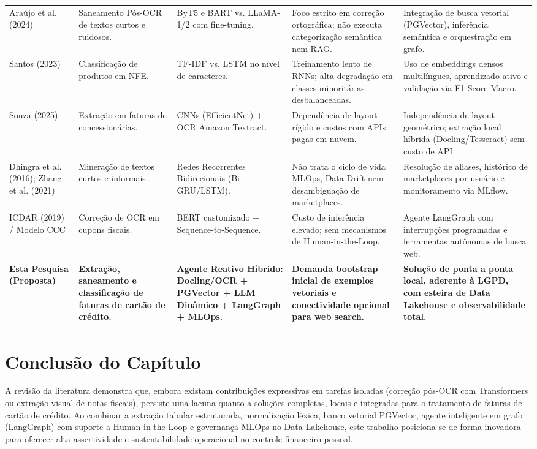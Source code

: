 \documentclass[
	12pt,				
	openright,			
	oneside,			
	a4paper,			
	english,			
	brazil				
	]{abntex2}
\begin{document}
\begin{tabularx}{\textwidth}{
		>{\raggedright\arraybackslash}p{2.6cm} 
		>{\raggedright\arraybackslash}X 
		>{\raggedright\arraybackslash}X 
		>{\raggedright\arraybackslash}X 
		>{\raggedright\arraybackslash}X
	}
	Araújo et al. (2024) & Saneamento Pós-OCR de textos curtos e ruidosos. & ByT5 e BART vs. LLaMA-1/2 com fine-tuning. & Foco estrito em correção ortográfica; não executa categorização semântica nem RAG. & Integração de busca vetorial (PGVector), inferência semântica e orquestração em grafo. \\
	\addlinespace
	Santos (2023) & Classificação de produtos em NFE. & TF-IDF vs. LSTM no nível de caracteres. & Treinamento lento de RNNs; alta degradação em classes minoritárias desbalanceadas. & Uso de embeddings densos multilíngues, aprendizado ativo e validação via F1-Score Macro. \\
	\addlinespace
	Souza (2025) & Extração em faturas de concessionárias. & CNNs (EfficientNet) + OCR Amazon Textract. & Dependência de layout rígido e custos com APIs pagas em nuvem. & Independência de layout geométrico; extração local híbrida (Docling/Tesseract) sem custo de API. \\
	\addlinespace
	Dhingra et al. (2016); Zhang et al. (2021) & Mineração de textos curtos e informais. & Redes Recorrentes Bidirecionais (Bi-GRU/LSTM). & Não trata o ciclo de vida MLOps, Data Drift nem desambiguação de marketplaces. & Resolução de aliases, histórico de marketplaces por usuário e monitoramento via MLflow. \\
	\addlinespace
	ICDAR (2019) / Modelo CCC & Correção de OCR em cupons fiscais. & BERT customizado + Sequence-to-Sequence. & Custo de inferência elevado; sem mecanismos de Human-in-the-Loop. & Agente LangGraph com interrupções programadas e ferramentas autônomas de busca web. \\
	\addlinespace
	\textbf{Esta Pesquisa (Proposta)} & \textbf{Extração, saneamento e classificação de faturas de cartão de crédito.} & \textbf{Agente Reativo Híbrido: Docling/OCR + PGVector + LLM Dinâmico + LangGraph + MLOps.} & \textbf{Demanda bootstrap inicial de exemplos vetoriais e conectividade opcional para web search.} & \textbf{Solução de ponta a ponta local, aderente à LGPD, com esteira de Data Lakehouse e observabilidade total.} \\
\end{tabularx}

\section{Conclusão do Capítulo}
\label{sec:rel_conclusao}

A revisão da literatura demonstra que, embora existam contribuições expressivas em tarefas isoladas (correção pós-OCR com Transformers ou extração visual de notas fiscais), persiste uma lacuna quanto a soluções completas, locais e integradas para o tratamento de faturas de cartão de crédito. Ao combinar a extração tabular estruturada, normalização léxica, banco vetorial PGVector, agente inteligente em grafo (LangGraph) com suporte a Human-in-the-Loop e governança MLOps no Data Lakehouse, este trabalho posiciona-se de forma inovadora para oferecer alta assertividade e sustentabilidade operacional no controle financeiro pessoal.
\end{document}
